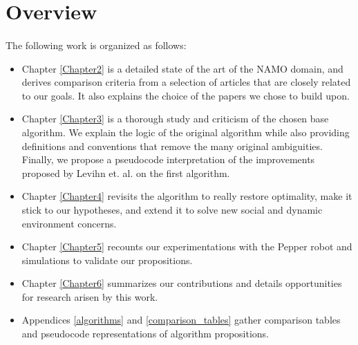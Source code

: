 \clearpage

\section{Overview}

\paragraph{} The following work is organized as follows:

\begin{itemize}
  \item Chapter \ref{Chapter2} is a detailed state of the art of the NAMO domain, and derives comparison criteria from a selection of articles that are closely related to our goals. It also explains the choice of the papers we chose to build upon.
  \item Chapter \ref{Chapter3} is a thorough study and criticism of the chosen base algorithm. We explain the logic of the original algorithm while also providing definitions and conventions that remove the many original ambiguities. Finally, we propose a pseudocode interpretation of the improvements proposed by Levihn et. al. on the first algorithm.
  \item Chapter \ref{Chapter4} revisits the algorithm to really restore optimality, make it stick to our hypotheses, and extend it to solve new social and dynamic environment concerns.
  \item Chapter \ref{Chapter5} recounts our experimentations with the Pepper robot and simulations to validate our propositions.
  \item Chapter \ref{Chapter6} summarizes our contributions and details opportunities for research arisen by this work.
  \item Appendices \ref{algorithms} and \ref{comparison_tables} gather comparison tables and pseudocode representations of algorithm propositions.
\end{itemize}
